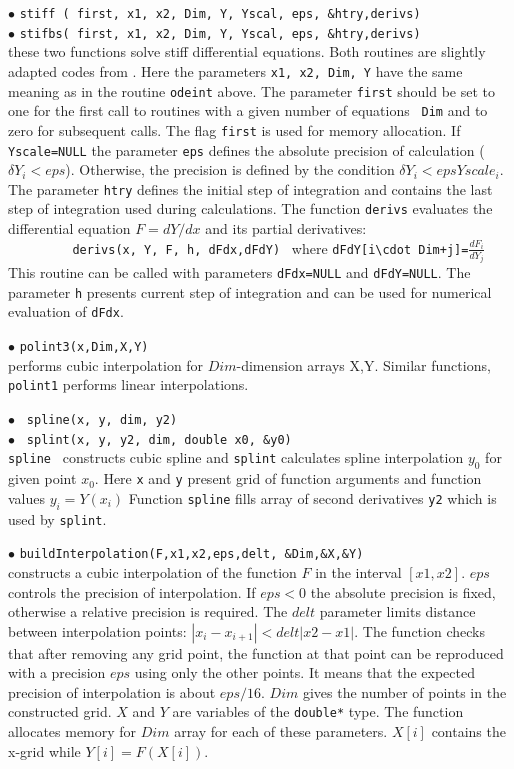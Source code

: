 \documentclass[12pt,a4paper]{article}
\begin{document}
{\noindent$\bullet$ \verb|stiff ( first, x1, x2, Dim, Y, Yscal, eps, &htry,derivs)|\\
\noindent$\bullet$ \verb|stifbs( first, x1, x2, Dim, Y, Yscal, eps, &htry,derivs)|\\
these two functions solve  stiff  differential
equations. Both routines  are slightly adapted codes from
\cite{Numerical}. Here the parameters  {\tt x1, x2, Dim, Y} have the same
meaning as in the routine  {\tt odeint}  above. The parameter {\tt first}
should be set to one for the first call to routines with a given number of equations {\tt
Dim} and to zero for subsequent calls.  The flag {\tt first} is used for memory allocation.  If {\tt Yscale=NULL}  the parameter
{\tt eps} defines the absolute precision of calculation ($\delta Y_i < eps$).  Otherwise, the
precision is defined by the  condition $\delta Y_i < eps Yscale_i$. 
The parameter {\tt htry} defines the initial step of integration and contains the last step of
integration used during  calculations.
The function {\tt derivs} evaluates the differential equation
$F= dY/dx$  and its partial derivatives:\\  
\verb|         derivs(x, Y, F, h, dFdx,dFdY) | where
\verb|dFdY[i\cdot Dim+j]=|$\frac{dF_i}{dY_j}$\\
This routine can
be called with parameters {\tt dFdx=NULL} and  {\tt dFdY=NULL}. The  parameter
{\tt h} presents current step of integration and can be used for numerical
evaluation of  {\tt dFdx}. 


\noindent$\bullet$ \verb|polint3(x,Dim,X,Y)|\\
performs   cubic interpolation for $Dim$-dimension arrays X,Y. Similar 
functions, \verb|polint1|  performs linear interpolations.

\noindent$\bullet$ \verb| spline(x, y, dim, y2)|\\
\noindent$\bullet$ \verb| splint(x, y, y2, dim, double x0, &y0)|\\
{\tt spline } constructs cubic  spline and {\tt splint} calculates spline
interpolation $y_0$  for given point $x_0$. Here  {\tt x} and {\tt y}
present grid of function arguments and function values $ y_i= Y(x_i)$
Function {\tt spline} fills   array of second  derivatives {\tt y2} which is 
used by  {\tt splint}.
   

\noindent$\bullet$ \verb|buildInterpolation(F,x1,x2,eps,delt, &Dim,&X,&Y)|\\
constructs  a cubic interpolation of the function $F$ in the interval $[x1,x2]$.
$eps$ controls the precision of interpolation. If $eps < 0$ the absolute 
precision is fixed, otherwise a relative precision is required.
The $delt$ parameter limits distance between  interpolation points: $|x_i
-x_{i+1}|<delt|x2-x1|$.  
The function checks that after removing any grid point, the function at that point
can be reproduced with a precision $eps$ using only the other points.  It means that
the expected precision of interpolation is about $eps/16$. $Dim$ gives the number 
of points in the  constructed grid. $X$ and $Y$ are variables of the  
\verb|double*| type. The function allocates memory for $Dim$ array for each 
 of these parameters. $X[i]$ contains the x-grid while $Y[i]=F(X[i])$.


}
\end{document}
